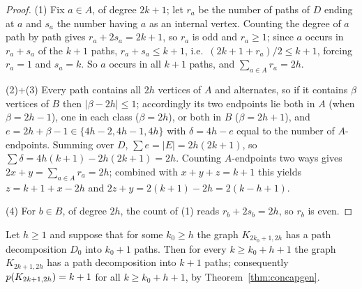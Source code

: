 \begin{proof}
(1) Fix $a\in A$, of degree $2k+1$; let $r_a$ be the number of paths of $D$
ending at $a$ and $s_a$ the number having $a$ as an internal vertex.
Counting the degree of $a$ path by path gives $r_a+2s_a=2k+1$, so $r_a$ is
odd and $r_a\ge1$; since $a$ occurs in $r_a+s_a$ of the $k+1$ paths,
$r_a+s_a\le k+1$, i.e.\ $(2k+1+r_a)/2\le k+1$, forcing $r_a=1$ and
$s_a=k$. So $a$ occurs in all $k+1$ paths, and $\sum_{a\in A}r_a=2h$.

(2)+(3) Every path contains all $2h$ vertices of $A$ and alternates, so if
it contains $\beta$ vertices of $B$ then $|\beta-2h|\le1$; accordingly its
two endpoints lie both in $A$ (when $\beta=2h-1$), one in each class
($\beta=2h$), or both in $B$ ($\beta=2h+1$), and
$e=2h+\beta-1\in\{4h-2,4h-1,4h\}$ with $\delta=4h-e$ equal to the number
of $A$-endpoints. Summing over $D$, $\sum e=|E|=2h(2k+1)$, so
$\sum\delta=4h(k+1)-2h(2k+1)=2h$. Counting $A$-endpoints two ways gives
$2x+y=\sum_{a\in A}r_a=2h$; combined with $x+y+z=k+1$ this yields
$z=k+1+x-2h$ and $2z+y=2(k+1)-2h=2(k-h+1)$.

(4) For $b\in B$, of degree $2h$, the count of (1) reads $r_b+2s_b=2h$, so
$r_b$ is even.
\end{proof}

\begin{theorem}\label{thm:conringclosure}
Let $h\ge1$ and suppose that for some $k_0\ge h$ the graph
$K_{2k_0+1,2h}$ has a path decomposition $D_0$ into $k_0+1$ paths. Then
for every $k\ge k_0+h+1$ the graph $K_{2k+1,2h}$ has a path decomposition
into $k+1$ paths; consequently $p(K_{2k+1,2h})=k+1$ for all
$k\ge k_0+h+1$, by Theorem~\ref{thm:concapgen}.
\end{theorem}


